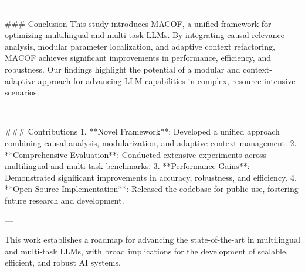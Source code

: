 ---

### Conclusion
This study introduces MACOF, a unified framework for optimizing multilingual and multi-task LLMs. By integrating causal relevance analysis, modular parameter localization, and adaptive context refactoring, MACOF achieves significant improvements in performance, efficiency, and robustness. Our findings highlight the potential of a modular and context-adaptive approach for advancing LLM capabilities in complex, resource-intensive scenarios.

---

### Contributions
1. **Novel Framework**: Developed a unified approach combining causal analysis, modularization, and adaptive context management.
2. **Comprehensive Evaluation**: Conducted extensive experiments across multilingual and multi-task benchmarks.
3. **Performance Gains**: Demonstrated significant improvements in accuracy, robustness, and efficiency.
4. **Open-Source Implementation**: Released the codebase for public use, fostering future research and development.

--- 

This work establishes a roadmap for advancing the state-of-the-art in multilingual and multi-task LLMs, with broad implications for the development of scalable, efficient, and robust AI systems.
